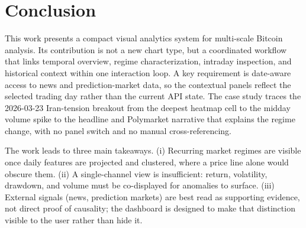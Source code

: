 \documentclass[journal,hideappendix]{vgtc}      %
\begin{document}
\section{Conclusion}
\label{sec:conclusion}

This work presents a compact visual analytics system for multi-scale Bitcoin analysis. 
Its contribution is not a new chart type, but a coordinated workflow that links temporal overview, regime characterization, intraday inspection, and historical context within one interaction loop. 
A key requirement is date-aware access to news and prediction-market data, so the contextual panels reflect the selected trading day rather than the current API state.
The case study traces the 2026-03-23 Iran-tension breakout from the deepest heatmap cell to the midday volume spike to the headline and Polymarket narrative that explains the regime change, with no panel switch and no manual cross-referencing.

The work leads to three main takeaways.   
(i) Recurring market regimes are visible once daily features are projected and clustered, where a price line alone would obscure them.
 (ii) A single-channel view is insufficient: return, volatility, drawdown, and volume must be co-displayed for anomalies to surface.  
(iii) External signals (news, prediction markets) are best read as supporting evidence, not direct proof of causality; the dashboard is designed to make that distinction visible to the user rather than hide it.





\end{document}
